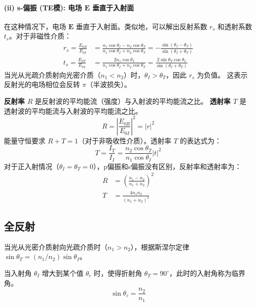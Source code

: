 \documentclass[fontset=none]{ctexart}
\begin{document}
\paragraph{(ii) s-偏振 (TE模): 电场 $\bm{E}$ 垂直于入射面}
在这种情况下，电场 $\bm{E}$ 垂直于入射面。类似地，可以解出反射系数 $r_s$ 和透射系数 $t_s$。对于非磁性介质：
\begin{align}
r_s = \frac{E_{0R}}{E_{0I}} 
&= \frac{n_1 \cos\theta_I - n_2 \cos\theta_T}{n_1 \cos\theta_I + n_2 \cos\theta_T} 
= -\frac{\sin(\theta_I - \theta_T)}{\sin(\theta_I + \theta_T)} \\
t_s = \frac{E_{0T}}{E_{0I}} 
&= \frac{2 n_1 \cos\theta_I}{n_1 \cos\theta_I + n_2 \cos\theta_T} 
= \frac{2 \sin\theta_T \cos\theta_I}{\sin(\theta_I + \theta_T)}
\end{align}
当光从光疏介质射向光密介质（$n_1 < n_2$）时，$\theta_I > \theta_T$，因此 $r_s$ 为负值。
这表示反射光的电场相位会反转 $\pi$（半波损失）。

\begin{definition}[反射率和透射率]
\textbf{反射率 $R$} 是反射波的平均能流（强度）与入射波的平均能流之比。
\textbf{透射率 $T$} 是透射波的平均能流与入射波的平均能流之比。
\begin{equation}
R = \left| \frac{E_{0R}}{E_{0I}} \right|^2 = |r|^2
\end{equation}
能量守恒要求 $R+T=1$（对于非吸收性介质）。透射率 $T$ 的表达式为：
\begin{equation}
T = \frac{I_T}{I_I} = \frac{n_2 \cos\theta_T}{n_1 \cos\theta_I} |t|^2
\end{equation}
对于正入射情况（$\theta_I = \theta_T = 0$），p偏振和s偏振没有区别，反射率和透射率为：
\begin{align}
R &= \left( \frac{n_1 - n_2}{n_1 + n_2} \right)^2 \\
T &= \frac{4 n_1 n_2}{(n_1 + n_2)^2}
\end{align}
\end{definition}


\subsection{全反射}
当光从光密介质射向光疏介质时（$n_1 > n_2$），根据斯涅尔定律 $\sin\theta_T = (n_1/n_2)\sin\theta_I$。
\begin{definition}[临界角]
当入射角 $\theta_I$ 增大到某个值 $\theta_c$ 时，使得折射角 $\theta_T = 90^\circ$，此时的入射角称为临界角。
\begin{equation}
\sin\theta_c = \frac{n_2}{n_1}
\end{equation}
\end{definition}
\end{document}
